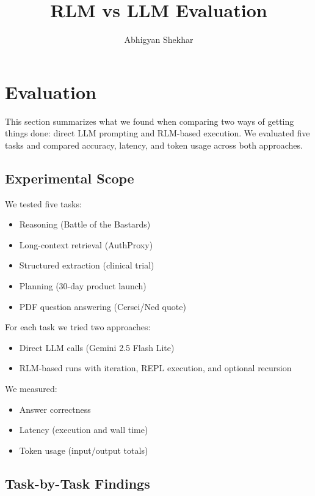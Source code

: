 \documentclass{article}
\title{RLM vs LLM Evaluation}
\author{Abhigyan Shekhar}
\date{}
\begin{document}
\maketitle

\section{Evaluation}

This section summarizes what we found when comparing two ways of getting things done: direct LLM prompting and RLM-based execution. We evaluated five tasks and compared accuracy, latency, and token usage across both approaches.

\subsection{Experimental Scope}

We tested five tasks:

\begin{itemize}
    \item Reasoning (Battle of the Bastards)
    \item Long-context retrieval (AuthProxy)
    \item Structured extraction (clinical trial)
    \item Planning (30-day product launch)
    \item PDF question answering (Cersei/Ned quote)
\end{itemize}

For each task we tried two approaches:

\begin{itemize}
    \item Direct LLM calls (Gemini 2.5 Flash Lite)
    \item RLM-based runs with iteration, REPL execution, and optional recursion
\end{itemize}

We measured:

\begin{itemize}
    \item Answer correctness
    \item Latency (execution and wall time)
    \item Token usage (input/output totals)
\end{itemize}

\subsection{Task-by-Task Findings}
\end{document}
